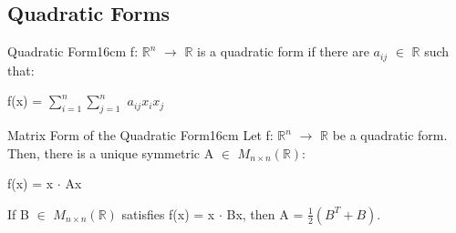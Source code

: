     \newpage





\subsection{ Quadratic Forms }

    \begin{definition}{Quadratic Form}{16cm}
        f: $\mathbb{R}^n$ $\rightarrow$ $\mathbb{R}$
        is a {\color{lblue} quadratic form} if there are
        $a_{ij}$ $\in$ $\mathbb{R}$ such that:

        \hspace{0.5cm}
        f(x) = $\sum_{i=1}^n \sum_{j=1}^n$ $a_{ij}x_ix_j$
    \end{definition}

    \vspace{0.5cm}



    \begin{wtheorem}{Matrix Form of the Quadratic Form}{16cm}
        Let f: $\mathbb{R}^n$ $\rightarrow$ $\mathbb{R}$
        be a quadratic form. Then, there is a unique symmetric
        A $\in$ $M_{n \times n}(\mathbb{R})$:

        \hspace{0.5cm}
        f(x) = x $\cdot$ Ax

        If B $\in$ $M_{n \times n}(\mathbb{R})$ satisfies
        f(x) = x $\cdot$ Bx, then A = $\frac{1}{2}(B^T + B)$.
    \end{wtheorem}

